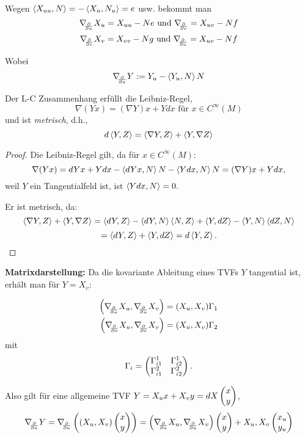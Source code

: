 \begin{remark}
	
	Wegen $ \left \langle X_{uu},N \right\rangle= -\left \langle X_u,N_u \right\rangle= e $ usw. bekommt man 
		\[ \nabla_{\!\!{\partial\over \partial u}}X_u = X_{uu}-Ne \text{ und } \nabla_{\!\!{\partial\over \partial v}} = X_{uv}-Nf \]
		\[ \nabla_{\!\!{\partial\over \partial v}}X_v = X_{vv}-Ng \text{ und } \nabla_{\!\!{\partial\over \partial u}} = X_{uv}-Nf \]
	
	Wobei $$ \nabla_{\!\!{\partial\over \partial u}}Y := Y_u - \left \langle Y_u,N \right\rangle N $$
	
\end{remark}

\begin{lemma}
	
	Der L-C Zusammenhang erfüllt die Leibniz-Regel,
		\[ \nabla(Yx) = (\nabla Y)x + Ydx \text{ für } x \in C^\infty(M) \] 
	und ist \emph{metrisch}, d.h., 
		\[ d\left \langle Y,Z \right\rangle = \left \langle \nabla Y,Z \right\rangle + \left \langle Y,\nabla Z \right\rangle \]
	
\end{lemma}

\begin{proof}
	
	Die Leibniz-Regel gilt, da für $x \in C^\infty(M)$:
		\[ \nabla(Yx) = dYx + Ydx- \left \langle dYx,N \right\rangle N - \left \langle Ydx,N \right\rangle N = (\nabla Y)x + Ydx, \]
	weil $ Y $ ein Tangentialfeld ist, ist $ \left \langle Ydx,N \right\rangle = 0. $ 
	
	Er ist metrisch, da:
		\[  \left \langle \nabla Y,Z \right\rangle + \left \langle Y,\nabla Z \right\rangle = \left \langle dY,Z \right\rangle -\left \langle dY,N \right\rangle\left \langle N,Z \right\rangle + \left \langle Y,dZ \right\rangle - \left \langle Y,N \right\rangle\left \langle dZ,N \right\rangle \]
		\[ = \left \langle dY,Z \right\rangle + \left \langle Y,dZ \right\rangle = d\left \langle Y,Z \right\rangle. \]
	
\end{proof}

\textbf{Matrixdarstellung:} Da die kovariante Ableitung eines TVFs $ Y $ tangential ist, erhält man für $ Y = X_v :$

\begin{equation} \label{Eq:Gamma}
\begin{split}
		 \left(\D{u}X_u,\D{u}X_v \right) &= (X_u,X_v)\Gamma_1  \\
		 \left(\D vX_u,\D vX_v \right) &= (X_u,X_v)\Gamma_2 
\end{split}
\end{equation} 
	mit 
		\[ \Gamma_i = \begin{pmatrix} \Gamma_{i1}^1 & \Gamma_{i2}^1 \\ \Gamma_{i1}^2 & \Gamma_{i2}^2 \end{pmatrix}. \]
		
	Also gilt für eine allgemeine TVF $ Y=X_ux+X_vy=dX\begin{pmatrix} x \\ y \end{pmatrix} $, 
		\[ \D{u}Y= \D{u}\left ( \left( X_u,X_v \right) \pmat{x \\y}    \right ) = \left( \D{u}X_u,\D{u}X_v \right) \pmat{x \\y} + X_u,X_v \pmat{x_u \\ y_u} \]


